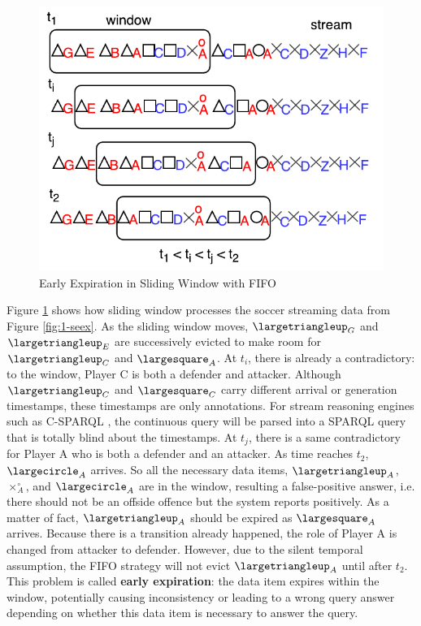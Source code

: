 \begin{figure}[!htbp]
	\centering
	\includegraphics[width=5in]{img/1-seexw.pdf}
	\caption{Early Expiration in Sliding Window with FIFO}
	\label{fig:1-seexw} 
\end{figure}

Figure \ref{fig:1-seexw} shows how sliding window processes the soccer streaming data from Figure \ref{fig:1-seex}. 
As the sliding window moves, $\largetriangleup_{G}$ and $\largetriangleup_{E}$ are successively evicted to make room for $\largetriangleup_{C}$ and $\largesquare_{A}$.
At $t_{i}$, there is already a contradictory: to the window, Player C is both a defender and attacker. 
Although $\largetriangleup_{C}$ and $\largesquare_{C}$ carry different arrival or generation timestamps, these timestamps are only annotations.
For stream reasoning engines such as C-SPARQL \cite{barbieri2010execution}, the continuous query will be parsed into a SPARQL query that is totally blind about the timestamps. 
At $t_{j}$, there is a same contradictory for Player A who is both a defender and an attacker. 
As time reaches $t_{2}$, $\largecircle_{A}$ arrives. 
So all the necessary data items, $\largetriangleup_{A}$, $\times^{\circ}_{A}$, and $\largecircle_{A}$ are in the window, resulting a false-positive answer, i.e. there should not be an offside offence but the system reports positively. 
As a matter of fact, $\largetriangleup_{A}$ should be expired as $\largesquare_{A}$ arrives.
Because there is a transition already happened, the role of Player A is changed from attacker to defender. 
However, due to the silent temporal assumption, the FIFO strategy will not evict $\largetriangleup_{A}$ until after $t_{2}$.
This problem is called \textbf{early expiration}: the data item expires within the window, potentially causing inconsistency or leading to a wrong query answer depending on whether this data item is necessary to answer the query. 
%
